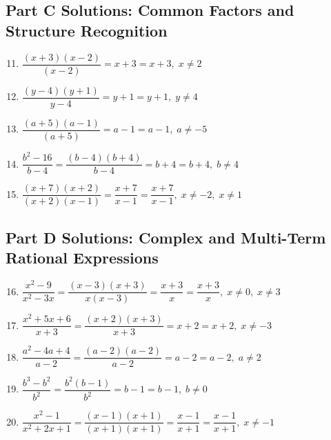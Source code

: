 \documentclass[14pt]{extarticle}
\begin{document}
\subsection*{Part C Solutions: Common Factors and Structure Recognition}
\begin{enumerate}
  \setcounter{enumi}{10}
  \item \(\dfrac{(x+3)(x-2)}{(x-2)}
  = x+3
  = \boxed{x+3}, \; x \ne 2\)

  \item \(\dfrac{(y-4)(y+1)}{y-4}
  = y+1
  = \boxed{y+1}, \; y \ne 4\)

  \item \(\dfrac{(a+5)(a-1)}{(a+5)}
  = a-1
  = \boxed{a-1}, \; a \ne -5\)

  \item \(\dfrac{b^2 - 16}{b - 4}
  = \dfrac{(b-4)(b+4)}{b-4}
  = b+4
  = \boxed{b+4}, \; b \ne 4\)

  \item \(\dfrac{(x+7)(x+2)}{(x+2)(x-1)}
  = \dfrac{x+7}{x-1}
  = \boxed{\dfrac{x+7}{x-1}}, \; x \ne -2,\; x \ne 1\)
\end{enumerate}

\subsection*{Part D Solutions: Complex and Multi-Term Rational Expressions}
\begin{enumerate}
  \setcounter{enumi}{15}
  \item \(\dfrac{x^2 - 9}{x^2 - 3x}
  = \dfrac{(x-3)(x+3)}{x(x-3)}
  = \dfrac{x+3}{x}
  = \boxed{\dfrac{x+3}{x}}, \; x \ne 0,\; x \ne 3\)

  \item \(\dfrac{x^2 + 5x + 6}{x + 3}
  = \dfrac{(x+2)(x+3)}{x+3}
  = x+2
  = \boxed{x+2}, \; x \ne -3\)

  \item \(\dfrac{a^2 - 4a + 4}{a - 2}
  = \dfrac{(a-2)(a-2)}{a-2}
  = a-2
  = \boxed{a-2}, \; a \ne 2\)

  \item \(\dfrac{b^3 - b^2}{b^2}
  = \dfrac{b^2(b-1)}{b^2}
  = b-1
  = \boxed{b-1}, \; b \ne 0\)

  \item \(\dfrac{x^2 - 1}{x^2 + 2x + 1}
  = \dfrac{(x-1)(x+1)}{(x+1)(x+1)}
  = \dfrac{x-1}{x+1}
  = \boxed{\dfrac{x-1}{x+1}}, \; x \ne -1\)
\end{enumerate}
\end{document}
